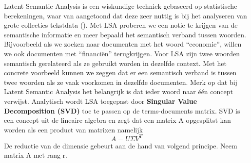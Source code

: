 Latent Semantic Analysis is een wiskundige techniek gebaseerd op statistische berekeningen, waar van aangetoond dat deze zeer nuttig is bij het analyseren van grote collecties tekstdata (\cite{furnas1988information}). Met LSA proberen we een notie te krijgen van de semantische informatie en meer bepaald het semantisch verband tussen woorden. Bijvoorbeeld als we zoeken naar documenten met het woord ``economie'', willen we ook documenten met ``financi\"en'' terugkrijgen. Voor LSA zijn twee woorden semantisch gerelateerd als ze gebruikt worden in dezelfde context. Met het concrete voorbeeld kunnen we zeggen dat er een semantisch verband is tussen twee woorden als ze vaak voorkomen in dezelfde documenten.
\newline
Merk op dat bij Latent Semantic Analysis het belangrijk is dat ieder woord naar \'e\'en concept verwijst.
%
\newline
Analytisch wordt LSA toegepast door \textbf{Singular Value Decomposition (SVD)} toe te passen op de terms-documents matrix. SVD is een concept uit de lineaire algebra en zegt dat een matrix A opgesplitst kan worden als een product van matrixen namelijk \\
\[A = U\Sigma V^T \]
De reductie van de dimensie gebeurt aan de hand van volgend principe. Neem matrix A met rang r.
%
\newcommand{\vect}{\mathbf}
\newcommand{\nul}{\operatorname{Nul}}
\newcommand{\col}{\operatorname{Kolommen }}
\newcommand{\row}{\operatorname{Rijen}}
